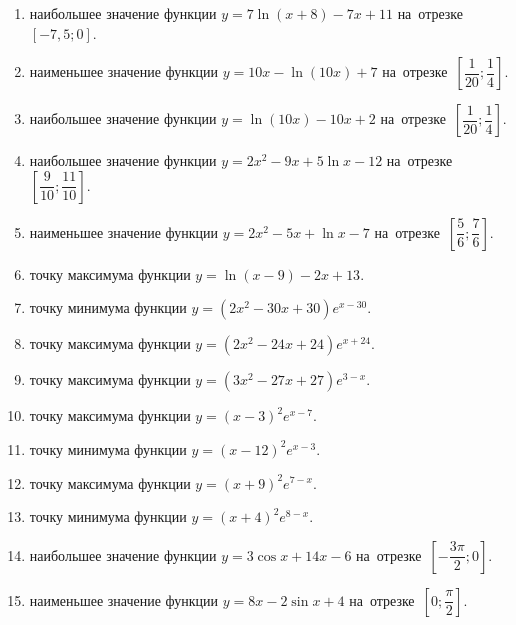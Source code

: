 \documentclass[a4paper,10pt]{article}
\begin{document}
\begin{enumerate}
\item {} наибольшее значение функции $y=7\ln \left(x+8\right)-7x+11$ на~отрезке~$\left[-7,5;0\right]$.

\item {} наименьшее значение функции $y=10x-\ln \left(10x\right)+7$ на~отрезке~$\left[\dfrac{1}{20};\dfrac{1}{4}\right]$.

\item {} наибольшее значение функции $y=\ln \left(10x\right)-10x+2$ на~отрезке~$\left[\dfrac{1}{20};\dfrac{1}{4}\right]$.

\item {} наибольшее значение функции $y=2x^2-9x+5\ln x-12$ на~отрезке~$\left[\dfrac{9}{10};\dfrac{11}{10}\right]$.

\item {} наименьшее значение функции $y=2x^2-5x+\ln x-7$ на~отрезке~$\left[\dfrac{5}{6};\dfrac{7}{6}\right]$.

\item {} точку максимума функции $y=\ln \left(x-9\right)-2x+13$.

\item {} точку минимума функции $y=\left(2x^2-30x+30\right)e^{x-30}$.

\item {} точку максимума функции $y=\left(2x^2-24x+24\right)e^{x+24}$.

\item {} точку максимума функции $y=\left(3x^2-27x+27\right)e^{3-x}$.

\item {} точку максимума функции $y=\left(x-3\right)^2e^{x-7}$.

\item {} точку минимума функции $y=\left(x-12\right)^2e^{x-3}$.

\item {} точку максимума функции $y=\left(x+9\right)^2e^{7-x}$.

\item {} точку минимума функции $y=\left(x+4\right)^2e^{8-x}$.

\item {} наибольшее значение функции $y=3\cos x+14x-6$ на~отрезке~$\left[-\dfrac{3\pi }{2};0\right]$.

\item {} наименьшее значение функции $y=8x-2\sin x+4$ на~отрезке~$\left[0;\dfrac{\pi }{2}\right]$.


\end{enumerate}
\end{document}
